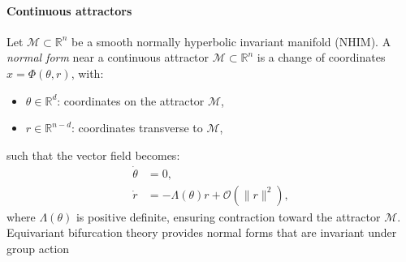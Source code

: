\documentclass{article}
\theoremstyle{definition} \newtheorem{definition}{Definition}  \newtheorem{example}{Example}
\theoremstyle{remark} \newtheorem{remark}{Remark}
\newcounter{ct}
\newcommand{\field}[1]{\ensuremath{\mathbb{#1}}}
\newcommand{\reals}{\field{R}}
\newcommand{\manifold}{\mathcal{M}}
\begin{document}
%


\paragraph{Continuous attractors}%
Let $\manifold\subset\reals^n$  be a smooth normally hyperbolic invariant manifold (NHIM).
A \emph{normal form} near a continuous attractor \(\manifold \subset \mathbb{R}^n \) is a change of coordinates 
\( x = \Phi(\theta, r) \), with:
\begin{itemize}
  \item \( \theta \in \mathbb{R}^d \): coordinates on the attractor \( \manifold\),
  \item \( r \in \mathbb{R}^{n-d} \): coordinates transverse to \(\manifold \),
\end{itemize}
such that the vector field becomes:
\[
\begin{aligned}
\dot{\theta} &= 0, \\
\dot{r} &= -\Lambda(\theta) r + \mathcal{O}(\|r\|^2),
\end{aligned}
\]
where \( \Lambda(\theta) \) is positive definite, ensuring contraction toward the attractor \(\manifold\).
%
Equivariant bifurcation theory provides normal forms that are invariant under group action


\end{document}
